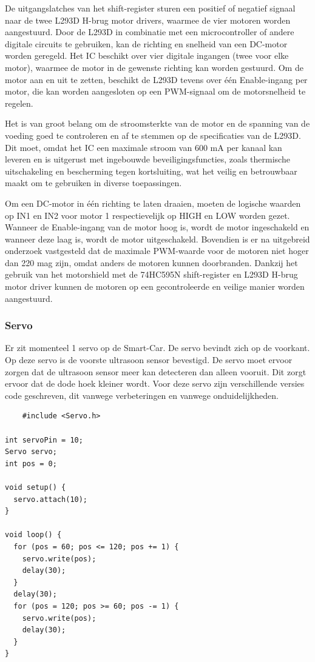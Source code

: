 De uitgangslatches van het \gls{shift-register} sturen een positief of negatief signaal naar de twee L293D\cite{h-brug} \gls{H-brug} motor drivers, waarmee de vier motoren worden aangestuurd. Door de L293D\cite{h-brug} in combinatie met een \gls{microcontroller} of andere digitale circuits te gebruiken, kan de richting en snelheid van een DC-motor worden geregeld. Het IC beschikt over vier digitale ingangen (twee voor elke motor), waarmee de motor in de gewenste richting kan worden gestuurd. Om de motor aan en uit te zetten, beschikt de L293D\cite{h-brug} tevens over één Enable-ingang per motor, die kan worden aangesloten op een \gls{PWM}-signaal om de motorsnelheid te regelen.

Het is van groot belang om de stroomsterkte van de motor en de spanning van de voeding goed te controleren en af te stemmen op de specificaties van de L293D\cite{h-brug}. Dit moet, omdat het IC een maximale stroom van 600 mA per kanaal kan leveren en is uitgerust met ingebouwde beveiligingsfuncties, zoals \gls{thermische} uitschakeling en bescherming tegen kortsluiting, wat het veilig en betrouwbaar maakt om te gebruiken in diverse toepassingen.

Om een DC-motor in één richting te laten draaien, moeten de logische waarden op IN1 en IN2 voor motor 1 respectievelijk op HIGH en LOW worden gezet. Wanneer de Enable-ingang van de motor hoog is, wordt de motor ingeschakeld en wanneer deze laag is, wordt de motor uitgeschakeld. Bovendien is er na uitgebreid onderzoek vastgesteld dat de maximale \gls{PWM}-waarde voor de motoren niet hoger dan 220 mag zijn, omdat anders de motoren kunnen doorbranden. Dankzij het gebruik van het \gls{motorshield} met de 74HC595N\cite{shiftregister} \gls{shift-register} en L293D\cite{h-brug} \gls{H-brug} motor driver kunnen de motoren op een gecontroleerde en veilige manier worden aangestuurd.

\subsubsection{Servo}
Er zit momenteel 1 servo op de \gls{Smart-Car}. De servo bevindt zich op de voorkant. Op deze servo is de voorste ultrasoon sensor bevestigd. De servo moet ervoor zorgen dat de ultrasoon sensor meer kan detecteren dan alleen vooruit. Dit zorgt ervoor dat de dode hoek kleiner wordt. Voor deze servo zijn verschillende versies code geschreven, dit vanwege verbeteringen en vanwege onduidelijkheden. 

\begin{lstlisting}
    #include <Servo.h>

int servoPin = 10;
Servo servo;
int pos = 0;   

void setup() {
  servo.attach(10); 
}

void loop() {
  for (pos = 60; pos <= 120; pos += 1) { 
    servo.write(pos);              
    delay(30);                      
  }
  delay(30);
  for (pos = 120; pos >= 60; pos -= 1) {
    servo.write(pos);              
    delay(30);                       
  }
}
\end{lstlisting}

